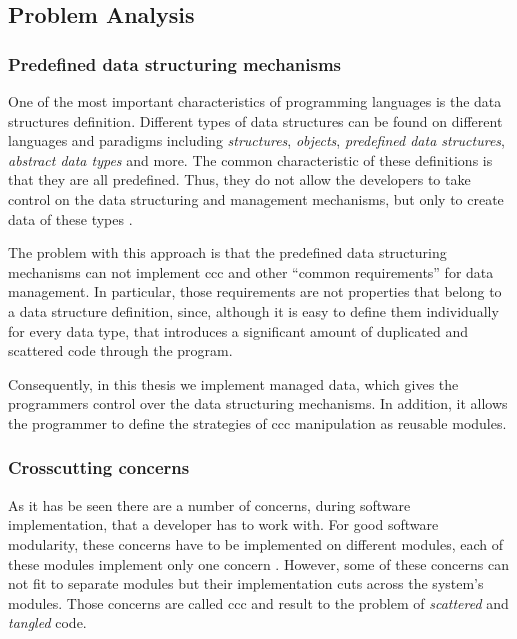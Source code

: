 \subsection{Problem Analysis}\label{Problem Analysis}

\subsubsection{Predefined data structuring mechanisms}\label{Predefined data structuring mechanisms problem}
One of the most important characteristics of programming languages is the data structures definition.
Different types of data structures can be found on different languages and paradigms including \textit{structures}, \textit{objects}, \textit{predefined data structures}, \textit{abstract data types} and more.
The common characteristic of these definitions is that they are all predefined. 
Thus, they do not allow the developers to take control on the data structuring and management mechanisms, but only to create data of these types \cite{loh2012managed}.

The problem with this approach is that the predefined data structuring mechanisms can not implement \acrlong{ccc} and other ``common requirements'' for data management. 
In particular, those requirements are not properties that belong to a data structure definition, since, although it is easy to define them individually for every data type, that introduces a significant amount of duplicated and scattered code through the program.

Consequently, in this thesis we implement managed data, which gives the programmers control over the data structuring mechanisms.
In addition, it allows the programmer to define the strategies of \ac{ccc} manipulation as reusable modules.

\subsubsection{Crosscutting concerns}\label{Cross cutting concerns problem}

As it has be seen \cite{hannemann2005role} there are a number of concerns, during software implementation, that a developer has to work with. 
For good software modularity, these concerns have to be implemented on different modules, each of these modules implement only one concern \cite{parnas1972criteria}.
However, some of these concerns can not fit to separate modules but their implementation cuts across the system's modules. 
Those concerns are called \acrlong{ccc} and result to the problem of \textit{scattered} and \textit{tangled} code. 

